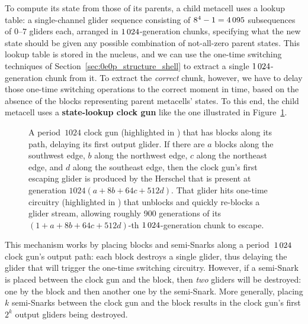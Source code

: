 To compute its state from those of its parents, a child metacell uses a lookup table: a single-channel glider sequence consisting of $8^4 - 1 = 4{\,}095$ subsequences of $0$--$7$ gliders each, arranged in $1{\,}024$-generation chunks, specifying what the new state should be given any possible combination of not-all-zero parent states. This lookup table is stored in the nucleus, and we can use the one-time switching techniques of Section~\ref{sec:0e0p_structure_shell} to extract a single $1{\,}024$-generation chunk from it. To extract the \emph{correct} chunk, however, we have to delay those one-time switching operations to the correct moment in time, based on the absence of the blocks representing parent metacells' states. To this end, the child metacell uses a \textbf{state-lookup clock gun} like the one illustrated in Figure~\ref{fig:state_lookup_clock_gun}.%

\begin{figure}[!htb]
	\centering
	\caption{A period~$1024$ clock gun (highlighted in ) that has blocks along its path, delaying its first output glider. If there are $a$ blocks along the southwest edge, $b$ along the northwest edge, $c$ along the northeast edge, and $d$ along the southeast edge, then the clock gun's first escaping glider is produced by the Herschel that is present at generation $1024(a + 8b + 64c + 512d)$. That glider hits one-time circuitry (highlighted in ) that unblocks and quickly re-blocks a glider stream, allowing roughly 900 generations of its $(1 + a + 8b + 64c + 512d)$-th $1{\,}024$-generation chunk to escape.}
	\label{fig:state_lookup_clock_gun}
\end{figure}

This mechanism works by placing blocks and semi-Snarks along a period~$1{\,}024$ clock gun's output path: each block destroys a single glider, thus delaying the glider that will trigger the one-time switching circuitry. However, if a semi-Snark is placed between the clock gun and the block, then \emph{two} gliders will be destroyed: one by the block and then another one by the semi-Snark. More generally, placing $k$ semi-Snarks between the clock gun and the block results in the clock gun's first $2^k$ output gliders being destroyed.

